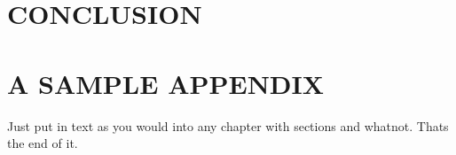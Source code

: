 \documentclass[BTech]{cetlyproj}
\begin{document}
\chapter{CONCLUSION}
\label{chap:concl}



\begin{singlespace}
  
\end{singlespace}


\appendix

\chapter{A SAMPLE APPENDIX}

Just put in text as you would into any chapter with sections and
whatnot.  Thats the end of it.






\end{document}

